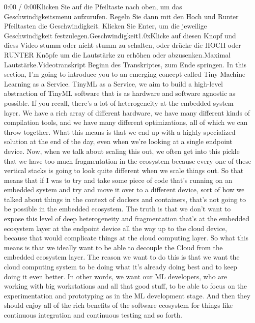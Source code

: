{{{{{    0:00 / 0:00Klicken Sie auf die Pfeiltaste nach oben, um das Geschwindigkeitsmenu aufzurufen. Regeln Sie dann mit den Hoch und Runter Pfeiltasten die Geschwindigkeit. Klicken Sie Enter, um die jeweilige Geschwindigkeit festzulegen.Geschwindigkeit1.0xKlicke auf diesen Knopf und diess Video stumm oder nicht stumm zu schalten, oder drücke die HOCH oder RUNTER Knöpfe um die Lautstärke zu erhöhen oder abzusenken.Maximal Lautstärke.Videotranskript
    Beginn des Transkriptes, zum Ende springen.
    In this section, I'm going to introduce you to an emerging concept called
    Tiny Machine Learning as a Service.
    TinyML as a Service, we aim to build a high-level abstraction
    of TinyML software that is as hardware and software agnostic as possible.
    If you recall, there's a lot of heterogeneity at the embedded system
    layer.
    We have a rich array of different hardware,
    we have many different kinds of compilation tools,
    and we have many different optimizations, all of which
    we can throw together.
    What this means is that we end up with a highly-specialized solution
    at the end of the day, even when we're looking at a single endpoint device.
    Now, when we talk about scaling this out, we often get into this pickle
    that we have too much fragmentation in the ecosystem
    because every one of these vertical stacks
    is going to look quite different when we scale things out.
    So that means that if I was to try and take some piece of code that's
    running on an embedded system and try and move it over to a different device,
    sort of how we talked about things in the context of dockers and containers,
    that's not going to be possible in the embedded ecosystem.
    The truth is that we don't want to expose this level of deep heterogeneity
    and fragmentation that's at the embedded ecosystem layer at the endpoint device
    all the way up to the cloud device, because that would complicate things
    at the cloud computing layer.
    So what this means is that we ideally want
    to be able to decouple the Cloud from the embedded ecosystem layer.
    The reason we want to do this is that we want the cloud computing
    system to be doing what it's already doing best
    and to keep doing it even better.
    In other words, we want our ML developers,
    who are working with big workstations and all that good stuff,
    to be able to focus on the experimentation
    and prototyping as in the ML development stage.
    And then they should enjoy all of the rich benefits of the software ecosystem
    for things like continuous integration and continuous testing and so forth.
}}}}}
